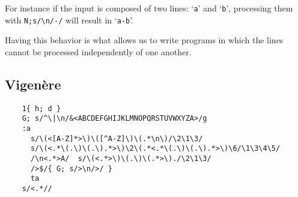 For instance if the input is composed of two lines: `{\tt a}' and `{\tt b}',
processing them with \verb|N;s/\n/-/| will result in `{\tt a-b}'.

Having this behavior is what allows us to write programs in which the lines
cannot be processed independently of one another.

\subsection{Vigen\`ere}

\begin{Verbatim}
	1{ h; d }
	G; s/^\|\n/&<ABCDEFGHIJKLMNOPQRSTUVWXYZA>/g
	:a
	  s/\(<[A-Z]*>\)\([^A-Z]\)\(.*\n\)/\2\1\3/
	  s/\(<.*\(.\)\(.\).*>\)\2\(.*<.*\(.\)\(.\).*>\)\6/\1\3\4\5/
	  /\n<.*>A/  s/\(<.*>\)\(.\)\(.*>\)./\2\1\3/
	  />$/{ G; s/>\n/>/ }
	  ta
	s/<.*//
\end{Verbatim}


